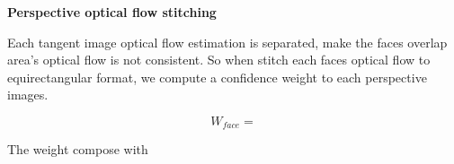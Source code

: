 
\textbf{Perspective optical flow stitching}

Each tangent image optical flow estimation is separated, make the faces overlap area's optical flow is not consistent.
So when stitch each faces optical flow to equirectangular format, we compute a confidence weight to each perspective images. 

\begin{equation}
W_{face} =
\end{equation}


The weight compose with 


